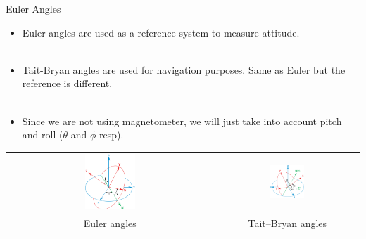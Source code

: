 \begin{frame}{Euler Angles}
\begin{itemize}
\item Euler angles are used as a reference system to measure attitude. \\~\\
\item Tait-Bryan angles are used for navigation purposes. Same as Euler but the reference is different. \\~\\
\item Since we are not using magnetometer, we will just take into account pitch and roll ($\theta$ and $\phi$ resp).
\end{itemize}

\begin{center}
\begin{tabular}{cc}
    \includegraphics[width=0.25\textwidth]{figures/euler_angles.png} &
    \includegraphics[width=0.25\textwidth]{figures/brian.png}
    \\
    Euler angles & Tait–Bryan angles
\end{tabular}
\end{center}
\end{frame}

